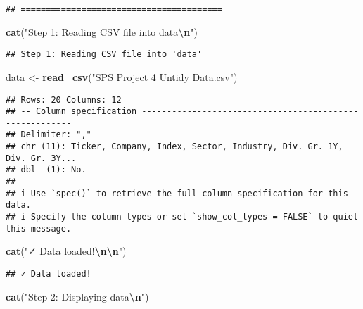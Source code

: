 \documentclass[
]{article}
\newenvironment{Shaded}{\begin{snugshade}}{\end{snugshade}}
\newcommand{\FunctionTok}[1]{\textcolor[rgb]{0.13,0.29,0.53}{\textbf{#1}}}
\newcommand{\NormalTok}[1]{#1}
\newcommand{\OtherTok}[1]{\textcolor[rgb]{0.56,0.35,0.01}{#1}}
\newcommand{\SpecialCharTok}[1]{\textcolor[rgb]{0.81,0.36,0.00}{\textbf{#1}}}
\newcommand{\StringTok}[1]{\textcolor[rgb]{0.31,0.60,0.02}{#1}}
\begin{document}
\begin{verbatim}
## ========================================
\end{verbatim}

\begin{Shaded}
\begin{Highlighting}[]
\FunctionTok{cat}\NormalTok{(}\StringTok{"Step 1: Reading CSV file into \textquotesingle{}data\textquotesingle{}}\SpecialCharTok{\textbackslash{}n}\StringTok{"}\NormalTok{)}
\end{Highlighting}
\end{Shaded}

\begin{verbatim}
## Step 1: Reading CSV file into 'data'
\end{verbatim}

\begin{Shaded}
\begin{Highlighting}[]
\NormalTok{data }\OtherTok{\textless{}{-}} \FunctionTok{read\_csv}\NormalTok{(}\StringTok{"SPS Project 4 Untidy Data.csv"}\NormalTok{)}
\end{Highlighting}
\end{Shaded}

\begin{verbatim}
## Rows: 20 Columns: 12
## -- Column specification --------------------------------------------------------
## Delimiter: ","
## chr (11): Ticker, Company, Index, Sector, Industry, Div. Gr. 1Y, Div. Gr. 3Y...
## dbl  (1): No.
## 
## i Use `spec()` to retrieve the full column specification for this data.
## i Specify the column types or set `show_col_types = FALSE` to quiet this message.
\end{verbatim}

\begin{Shaded}
\begin{Highlighting}[]
\FunctionTok{cat}\NormalTok{(}\StringTok{"✓ Data loaded!}\SpecialCharTok{\textbackslash{}n\textbackslash{}n}\StringTok{"}\NormalTok{)}
\end{Highlighting}
\end{Shaded}

\begin{verbatim}
## ✓ Data loaded!
\end{verbatim}

\begin{Shaded}
\begin{Highlighting}[]
\FunctionTok{cat}\NormalTok{(}\StringTok{"Step 2: Displaying \textquotesingle{}data\textquotesingle{}}\SpecialCharTok{\textbackslash{}n}\StringTok{"}\NormalTok{)}
\end{Highlighting}
\end{Shaded}
\end{document}
